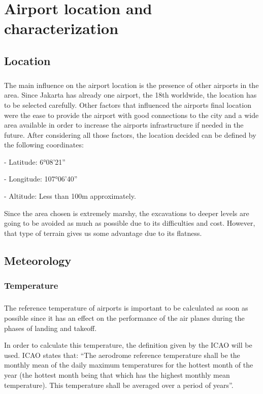 \chapter{Airport location and characterization}
	\section{Location}
\paragraph{} The main influence on the airport location is the presence of other airports in the area. Since
Jakarta has already one airport, the 18th worldwide, the location has to be selected carefully.
Other factors that influenced the airports final location were the ease to provide the airport
with good connections to the city and a wide area available in order to increase the airports
infrastructure if needed in the future.
After considering all those factors, the location decided can be defined by the following coordinates:

- Latitude: 6°08'21''

- Longitude: 107°06'40''

- Altitude: Less than 100m approximately.

Since the area chosen is extremely marshy, the excavations to deeper levels are going to be
avoided as much as possible due to its difficulties and cost. However, that type of terrain gives us some advantage due to its flatness.
	\section{Meteorology}
		\subsection{Temperature}
		\paragraph{}The reference temperature of airports is important to be calculated as soon as possible since it has an effect on the performance of the air planes during the phases of landing and takeoff. 
		
		In order to calculate this temperature, the definition given by the ICAO will be used. ICAO states that: “The aerodrome reference temperature shall be the monthly mean of the daily maximum temperatures for the hottest month of the year (the hottest month being that which has the highest monthly mean temperature). This temperature shall be averaged over a period of years”.
		
